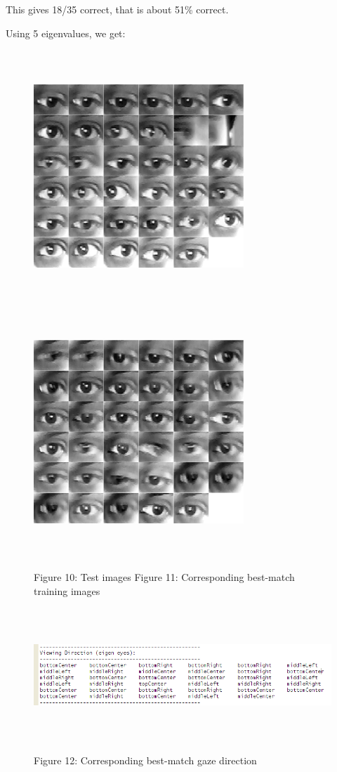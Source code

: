 \documentclass[12pt,letterpaper]{article}
\begin{document}
This gives 18/35 correct, that is about 51\% correct.

\newpage

Using 5 eigenvalues, we get:

\begin{figure}[h]
\includegraphics[width=79mm,height=95mm]{testImg3.png}
\hfill
\includegraphics[width=79mm,height=95mm]{matchImg3.png}

\small \quad\qquad\qquad\qquad\qquad Figure 10: Test images \qquad\qquad\qquad
\small Figure 11: Corresponding best-match training images
\end{figure}

\begin{figure}[h]
\centering
\includegraphics[width=170mm,height=50mm]{viewingDir3.png}

\small Figure 12: Corresponding best-match gaze direction
\end{figure}
\end{document}
